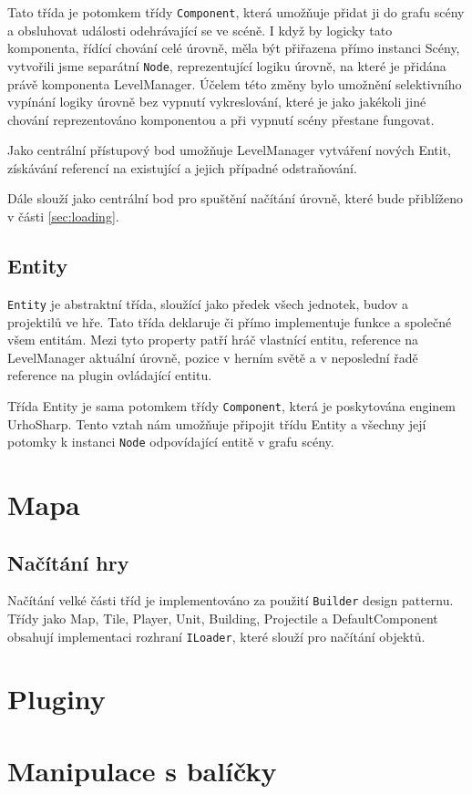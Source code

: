 Tato třída je potomkem třídy \texttt{Component}, která umožňuje přidat ji do grafu scény a obsluhovat události odehrávající se ve scéně. I když by logicky tato komponenta, řídící chování celé úrovně, měla být přiřazena přímo instanci Scény, vytvořili jsme separátní \texttt{Node}, reprezentující logiku úrovně, na které je přidána právě komponenta LevelManager. Účelem této změny bylo umožnění selektivního vypínání logiky úrovně bez vypnutí vykreslování, které je jako jakékoli jiné chování reprezentováno komponentou a při vypnutí scény přestane fungovat.

Jako centrální přístupový bod umožňuje LevelManager vytváření nových Entit, získávání referencí na existující a jejich případné odstraňování. 

Dále slouží jako centrální bod pro spuštění načítání úrovně, které bude přiblíženo v části \ref{sec:loading}.
\subsection{Entity}
\texttt{Entity} je abstraktní třída, sloužící jako předek všech jednotek, budov a projektilů ve hře. Tato třída deklaruje či přímo implementuje funkce a  společné všem entitám. Mezi tyto property patří hráč vlastnící entitu, reference na LevelManager aktuální úrovně, pozice v herním světě a v neposlední řadě reference na plugin ovládající entitu.

Třída Entity je sama potomkem třídy \texttt{Component}, která je poskytována enginem UrhoSharp. Tento vztah nám umožňuje připojit třídu Entity a všechny její potomky k instanci \texttt{Node} odpovídající entitě v grafu scény.

\section{Mapa}

\subsection{Načítání hry}
Načítání velké části tříd je implementováno za použití \texttt{Builder} design patternu. Třídy jako Map, Tile, Player, Unit, Building, Projectile a DefaultComponent obsahují implementaci rozhraní \texttt{ILoader}, které slouží pro načítání objektů. 
\section{Pluginy}

\section{Manipulace s balíčky}



